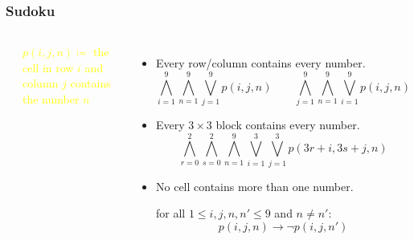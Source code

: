 \documentclass[UTF8,11pt,colorlinks,compress,openany]{beamer}%
\begin{document}
\begin{frame}\frametitle{Sudoku}
\begin{columns}
\begin{center}
\end{center}
\centering\textcolor{yellow}{$p(i,j,n)\coloneqq $ the cell in row $i$ and column $j$ contains the number $n$}
\begin{itemize}
				\item Every row/column contains every number.
				\[\bigwedge\limits_{i=1}^9\bigwedge\limits_{n=1}^9\bigvee\limits_{j=1}^9 p(i,j,n)\qquad\bigwedge\limits_{j=1}^9\bigwedge\limits_{n=1}^9\bigvee\limits_{i=1}^9 p(i,j,n)\]
				\item Every $3\times3$ block contains every number.
				\[\bigwedge\limits_{r=0}^2\bigwedge\limits_{s=0}^2\bigwedge\limits_{n=1}^9\bigvee\limits_{i=1}^3\bigvee\limits_{j=1}^3 p(3r+i,3s+j,n)\]
				\item No cell contains more than one number.
				
				for all $1\leq i,j,n,n'\leq 9$ and $n\neq n'$: \[p(i,j,n)\to\neg p(i,j,n')\]
\end{itemize}
\end{columns}
\end{frame}
\end{document}
